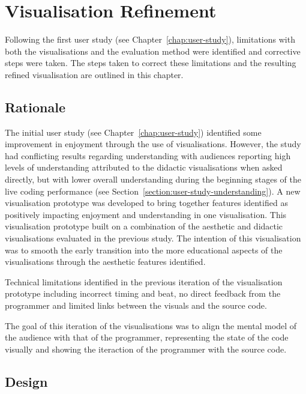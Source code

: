
\chapter{Visualisation Refinement}
\label{chap:visualisation-refinement}

Following the first user study (see Chapter~\ref{chap:user-study}), limitations with both the visualisations and the evaluation method were identified and corrective steps were taken. The steps taken to correct these limitations and the resulting refined visualisation are outlined in this chapter.

\section{Rationale}

The initial user study (see Chapter~\ref{chap:user-study}) identified some improvement in enjoyment through the use of visualisations. However, the study had conflicting results regarding understanding with audiences reporting high levels of understanding attributed to the didactic visualisations when asked directly, but with lower overall understanding during the beginning stages of the live coding performance (see Section~\ref{section:user-study-understanding}). A new visualisation prototype was developed to bring together features identified as positively impacting enjoyment and understanding in one visualisation. This visualisation prototype built on a combination of the aesthetic and didactic visualisations evaluated in the previous study. The intention of this visualisation was to smooth the early transition into the more educational aspects of the visualisations through the aesthetic features identified.

Technical limitations identified in the previous iteration of the visualisation prototype including incorrect timing and beat, no direct feedback from the programmer and limited links between the visuals and the source code. 

The goal of this iteration of the visualisations was to align the mental model of the audience with that of the programmer, representing the state of the code visually and showing the iteraction of the programmer with the source code.


\section{Design}

